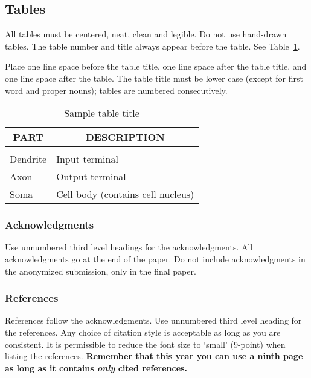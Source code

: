 \documentclass{article} %
\begin{document}
\subsection{Tables}

All tables must be centered, neat, clean and legible. Do not use hand-drawn
tables. The table number and title always appear before the table. See
Table~\ref{sample-table}.

Place one line space before the table title, one line space after the table
title, and one line space after the table. The table title must be lower case
(except for first word and proper nouns); tables are numbered consecutively.

\begin{table}[t]
\caption{Sample table title}
\label{sample-table}
\begin{center}
\begin{tabular}{ll}
\multicolumn{1}{c}{\bf PART}  &\multicolumn{1}{c}{\bf DESCRIPTION}
\\ \hline \\
Dendrite         &Input terminal \\
Axon             &Output terminal \\
Soma             &Cell body (contains cell nucleus) \\
\end{tabular}
\end{center}
\end{table}




\subsubsection*{Acknowledgments}

Use unnumbered third level headings for the acknowledgments. All
acknowledgments go at the end of the paper. Do not include 
acknowledgments in the anonymized submission, only in the 
final paper. 

\subsubsection*{References}

References follow the acknowledgments. Use unnumbered third level heading for
the references. Any choice of citation style is acceptable as long as you are
consistent. It is permissible to reduce the font size to `small' (9-point) 
when listing the references. {\bf Remember that this year you can use
a ninth page as long as it contains \emph{only} cited references.}
\end{document}
